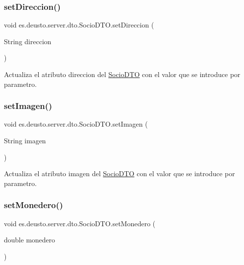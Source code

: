 \subsubsection{\texorpdfstring{setDireccion()}{setDireccion()}}
{\footnotesize\ttfamily void es.\+deusto.\+server.\+dto.\+Socio\+D\+T\+O.\+set\+Direccion (\begin{DoxyParamCaption}\item[{String}]{direccion }\end{DoxyParamCaption})}

Actualiza el atributo direccion del \mbox{\hyperlink{classes_1_1deusto_1_1server_1_1dto_1_1_socio_d_t_o}{Socio\+D\+TO}} con el valor que se introduce por parametro. \mbox{\label{classes_1_1deusto_1_1server_1_1dto_1_1_socio_d_t_o_ac9a4d6ccd94aea976005f5191c5f4dbf}} 
\subsubsection{\texorpdfstring{setImagen()}{setImagen()}}
{\footnotesize\ttfamily void es.\+deusto.\+server.\+dto.\+Socio\+D\+T\+O.\+set\+Imagen (\begin{DoxyParamCaption}\item[{String}]{imagen }\end{DoxyParamCaption})}

Actualiza el atributo imagen del \mbox{\hyperlink{classes_1_1deusto_1_1server_1_1dto_1_1_socio_d_t_o}{Socio\+D\+TO}} con el valor que se introduce por parametro. \mbox{\label{classes_1_1deusto_1_1server_1_1dto_1_1_socio_d_t_o_a37f48e00e74e18cb21eeaf00f444fbef}} 
\subsubsection{\texorpdfstring{setMonedero()}{setMonedero()}}
{\footnotesize\ttfamily void es.\+deusto.\+server.\+dto.\+Socio\+D\+T\+O.\+set\+Monedero (\begin{DoxyParamCaption}\item[{double}]{monedero }\end{DoxyParamCaption})}

